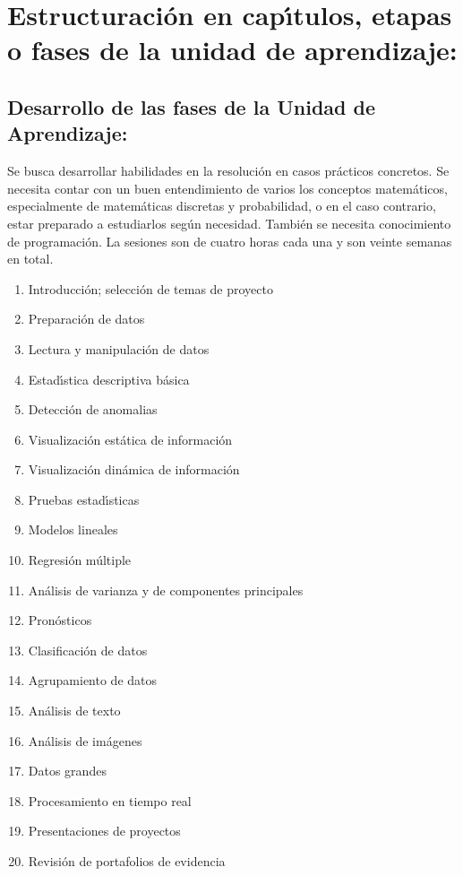 \documentclass[10 pt]{article}
\begin{document}
\newpage

\section{Estructuraci\'{o}n en cap\'{\i}tulos, etapas o fases de la unidad de
  aprendizaje:}
\subsection{Desarrollo de las fases de la Unidad de Aprendizaje:}

Se busca desarrollar habilidades en la resoluci\'{o}n en casos
pr\'{a}cticos concretos. Se necesita contar con un buen entendimiento
de varios los conceptos matem\'{a}ticos, especialmente de
matem\'{a}ticas discretas y probabilidad, o en el caso contrario,
estar preparado a estudiarlos seg\'{u}n necesidad. Tambi\'{e}n se
necesita conocimiento de programaci\'{o}n.  La sesiones son de cuatro
horas cada una y son veinte semanas en total.
\begin{enumerate}[itemsep=-3pt]
\item{Introducci\'{o}n; selecci\'{o}n de temas de proyecto}
\item{Preparaci\'{o}n de datos}
\item{Lectura y manipulaci\'{o}n de datos}
\item{Estad\'{\i}stica descriptiva b\'{a}sica}
\item{Detecci\'{o}n de anomalias}
\item{Visualizaci\'{o}n est\'{a}tica de informaci\'{o}n}
\item{Visualizaci\'{o}n din\'{a}mica de informaci\'{o}n}
\item{Pruebas estad\'{\i}sticas}
\item{Modelos lineales}
\item{Regresi\'{o}n m\'{u}ltiple}
\item{An\'{a}lisis de varianza y de componentes principales}
\item{Pron\'{o}sticos}
\item{Clasificaci\'{o}n de datos}
\item{Agrupamiento de datos}
\item{An\'{a}lisis de texto}
\item{An\'{a}lisis de im\'{a}genes}
\item{Datos grandes}
\item{Procesamiento en tiempo real}
\item{Presentaciones de proyectos}
\item{Revisi\'{o}n de portafolios de evidencia}
\end{enumerate}
\end{document}
